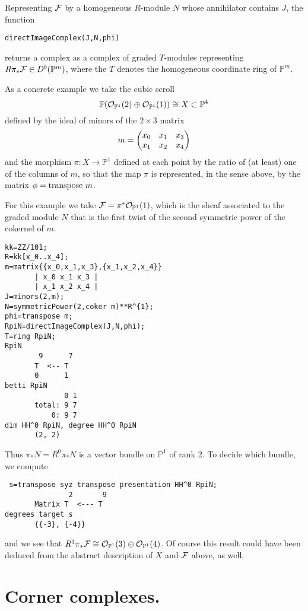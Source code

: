 \documentclass[twoside,12pt, leqno]{amsart}
\def\PP{{\mathbb P}}
\def\P{{\mathbb P}}
\begin{document}
Representing ${\mathcal F}$ by  a homogeneous $R$-module $N$
whose annihilator contains $J$, the function
{\small \begin{verbatim}
directImageComplex(J,N,phi)
\end{verbatim} }
returns a complex as a complex of graded $T$-modules representing $R\pi_* \sF \in D^b(\PP^m)$, where the $T$ denotes  the homogeneous coordinate ring of $\PP^m$.

As a concrete example we take the cubic scroll 
$$\PP(\sO_{\PP^1}(2) \oplus \sO_{\PP^1}(1))\cong X\subset \PP^4
$$ 
defined by the ideal of minors of the $2\times 3$ matrix
$$
m=\begin{pmatrix}
x_0& x_1 & x_3 \cr
x_1 & x_2 & x_4 \cr
\end{pmatrix}   
$$
and the morphism $\pi :X \to \PP^1$ defined at each point by the ratio of (at least) one of 
the columns of $m$, so that the map $\pi$ is represented, in the sense above,
by the matrix $\phi = {\rm transpose}\ m$. 

For this example we take $\sF = \pi^*\sO_{\PP^1}(1)$, which is the sheaf associated to the
graded module
$N$ that is the first twist of the second symmetric power of the cokernel 
of $m$.
{\small\begin{verbatim}
kk=ZZ/101;
R=kk[x_0..x_4];
m=matrix{{x_0,x_1,x_3},{x_1,x_2,x_4}}
       | x_0 x_1 x_3 |
       | x_1 x_2 x_4 |
J=minors(2,m);
N=symmetricPower(2,coker m)**R^{1};
phi=transpose m;
RpiN=directImageComplex(J,N,phi);
T=ring RpiN;
RpiN
        9      7
       T  <-- T               
       0      1
betti RpiN
              0 1
       total: 9 7
           0: 9 7
dim HH^0 RpiN, degree HH^0 RpiN
       (2, 2)
\end{verbatim}
\noindent Thus $\pi_*N = R^0\pi_*N$ is a vector bundle on $\P^1$ of rank 2.
To decide which bundle, we compute
\begin{verbatim}
 s=transpose syz transpose presentation HH^0 RpiN;
               2       9
       Matrix T  <--- T
degrees target s
       {{-3}, {-4}} 
\end{verbatim} }
\noindent and we see that $R^1\pi_* \sF \cong \sO_{\PP^1}(3) \oplus \sO_{\PP^1}(4)$.
Of course this result could have been deduced from the abstract description of $X$ and ${\mathcal F}$
above, as well.

\section{Corner complexes.}\label{sec:cornercomplex}
\end{document}
